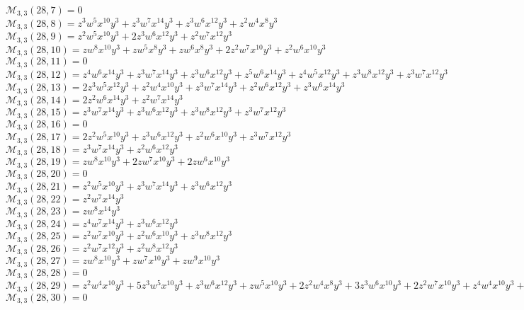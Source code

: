 $\mathcal{M}_{3,3}(28,7)=0$\\
$\mathcal{M}_{3,3}(28,8)=z^3w^5x^{10}y^3+z^3w^7x^{14}y^3+z^3w^6x^{12}y^3+z^2w^4x^8y^3$\\
$\mathcal{M}_{3,3}(28,9)=z^2w^5x^{10}y^3+2z^3w^6x^{12}y^3+z^2w^7x^{12}y^3$\\
$\mathcal{M}_{3,3}(28,10)=zw^8x^{10}y^3+zw^5x^8y^3+zw^6x^8y^3+2z^2w^7x^{10}y^3+z^2w^6x^{10}y^3$\\
$\mathcal{M}_{3,3}(28,11)=0$\\
$\mathcal{M}_{3,3}(28,12)=z^4w^6x^{14}y^3+z^3w^7x^{14}y^3+z^3w^6x^{12}y^3+z^5w^6x^{14}y^3+z^4w^5x^{12}y^3+z^3w^8x^{12}y^3+z^3w^7x^{12}y^3$\\
$\mathcal{M}_{3,3}(28,13)=2z^3w^5x^{12}y^3+z^2w^4x^{10}y^3+z^3w^7x^{14}y^3+z^2w^6x^{12}y^3+z^3w^6x^{14}y^3$\\
$\mathcal{M}_{3,3}(28,14)=2z^2w^6x^{14}y^3+z^2w^7x^{14}y^3$\\
$\mathcal{M}_{3,3}(28,15)=z^3w^7x^{14}y^3+z^3w^6x^{12}y^3+z^3w^8x^{12}y^3+z^3w^7x^{12}y^3$\\
$\mathcal{M}_{3,3}(28,16)=0$\\
$\mathcal{M}_{3,3}(28,17)=2z^2w^5x^{10}y^3+z^3w^6x^{12}y^3+z^2w^6x^{10}y^3+z^3w^7x^{12}y^3$\\
$\mathcal{M}_{3,3}(28,18)=z^3w^7x^{14}y^3+z^2w^6x^{12}y^3$\\
$\mathcal{M}_{3,3}(28,19)=zw^8x^{10}y^3+2zw^7x^{10}y^3+2zw^6x^{10}y^3$\\
$\mathcal{M}_{3,3}(28,20)=0$\\
$\mathcal{M}_{3,3}(28,21)=z^2w^5x^{10}y^3+z^3w^7x^{14}y^3+z^3w^6x^{12}y^3$\\
$\mathcal{M}_{3,3}(28,22)=z^2w^7x^{14}y^3$\\
$\mathcal{M}_{3,3}(28,23)=zw^8x^{14}y^3$\\
$\mathcal{M}_{3,3}(28,24)=z^4w^7x^{14}y^3+z^3w^6x^{12}y^3$\\
$\mathcal{M}_{3,3}(28,25)=z^2w^7x^{10}y^3+z^2w^6x^{10}y^3+z^3w^8x^{12}y^3$\\
$\mathcal{M}_{3,3}(28,26)=z^2w^7x^{12}y^3+z^2w^8x^{12}y^3$\\
$\mathcal{M}_{3,3}(28,27)=zw^8x^{10}y^3+zw^7x^{10}y^3+zw^9x^{10}y^3$\\
$\mathcal{M}_{3,3}(28,28)=0$\\
$\mathcal{M}_{3,3}(28,29)=z^2w^4x^{10}y^3+5z^3w^5x^{10}y^3+z^3w^6x^{12}y^3+zw^5x^{10}y^3+2z^2w^4x^8y^3+3z^3w^6x^{10}y^3+2z^2w^7x^{10}y^3+z^4w^4x^{10}y^3+z^2w^5x^8y^3$\\
$\mathcal{M}_{3,3}(28,30)=0$\\
